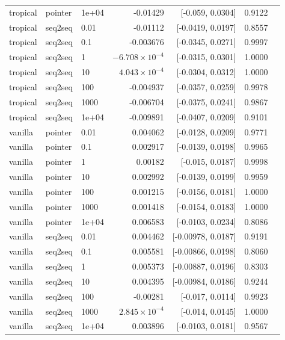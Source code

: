 \documentclass[10pt]{article}
\begin{document}
{\begin{longtable}{lllrrrl}
tropical & pointer & 1e+04 & -0.01429 & [-0.059, 0.0304] & 0.9122 & \\
tropical & seq2seq & 0.01 & -0.01112 & [-0.0419, 0.0197] & 0.8557 & \\
tropical & seq2seq & 0.1 & -0.003676 & [-0.0345, 0.0271] & 0.9997 & \\
tropical & seq2seq & 1 & $-6.708\times10^{-4}$ & [-0.0315, 0.0301] & 1.0000 & \\
tropical & seq2seq & 10 & $4.043\times10^{-4}$ & [-0.0304, 0.0312] & 1.0000 & \\
tropical & seq2seq & 100 & -0.004937 & [-0.0357, 0.0259] & 0.9978 & \\
tropical & seq2seq & 1000 & -0.006704 & [-0.0375, 0.0241] & 0.9867 & \\
tropical & seq2seq & 1e+04 & -0.009891 & [-0.0407, 0.0209] & 0.9101 & \\
vanilla & pointer & 0.01 & 0.004062 & [-0.0128, 0.0209] & 0.9771 & \\
vanilla & pointer & 0.1 & 0.002917 & [-0.0139, 0.0198] & 0.9965 & \\
vanilla & pointer & 1 & 0.00182 & [-0.015, 0.0187] & 0.9998 & \\
vanilla & pointer & 10 & 0.002992 & [-0.0139, 0.0199] & 0.9959 & \\
vanilla & pointer & 100 & 0.001215 & [-0.0156, 0.0181] & 1.0000 & \\
vanilla & pointer & 1000 & 0.001418 & [-0.0154, 0.0183] & 1.0000 & \\
vanilla & pointer & 1e+04 & 0.006583 & [-0.0103, 0.0234] & 0.8086 & \\
vanilla & seq2seq & 0.01 & 0.004462 & [-0.00978, 0.0187] & 0.9191 & \\
vanilla & seq2seq & 0.1 & 0.005581 & [-0.00866, 0.0198] & 0.8060 & \\
vanilla & seq2seq & 1 & 0.005373 & [-0.00887, 0.0196] & 0.8303 & \\
vanilla & seq2seq & 10 & 0.004395 & [-0.00984, 0.0186] & 0.9244 & \\
vanilla & seq2seq & 100 & -0.00281 & [-0.017, 0.0114] & 0.9923 & \\
vanilla & seq2seq & 1000 & $2.845\times10^{-4}$ & [-0.014, 0.0145] & 1.0000 & \\
vanilla & seq2seq & 1e+04 & 0.003896 & [-0.0103, 0.0181] & 0.9567 & \\
\bottomrule
\end{longtable}
}
\end{document}
